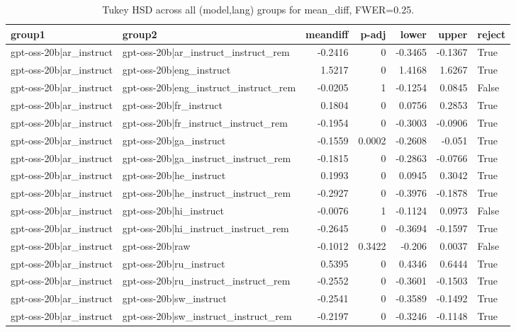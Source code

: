 \begin{table}
\caption{Tukey HSD across all (model,lang) groups for mean_diff, FWER=0.25.}
\label{tab:tukey_all_models_all_langs_mean_diff}
\begin{tabular}{l l r r r r l}
\toprule
group1 & group2 & meandiff & p-adj & lower & upper & reject \\
\midrule
gpt-oss-20b|ar_instruct & gpt-oss-20b|ar_instruct_instruct_rem & -0.2416 & 0 & -0.3465 & -0.1367 & True \\
gpt-oss-20b|ar_instruct & gpt-oss-20b|eng_instruct & 1.5217 & 0 & 1.4168 & 1.6267 & True \\
gpt-oss-20b|ar_instruct & gpt-oss-20b|eng_instruct_instruct_rem & -0.0205 & 1 & -0.1254 & 0.0845 & False \\
gpt-oss-20b|ar_instruct & gpt-oss-20b|fr_instruct & 0.1804 & 0 & 0.0756 & 0.2853 & True \\
gpt-oss-20b|ar_instruct & gpt-oss-20b|fr_instruct_instruct_rem & -0.1954 & 0 & -0.3003 & -0.0906 & True \\
gpt-oss-20b|ar_instruct & gpt-oss-20b|ga_instruct & -0.1559 & 0.0002 & -0.2608 & -0.051 & True \\
gpt-oss-20b|ar_instruct & gpt-oss-20b|ga_instruct_instruct_rem & -0.1815 & 0 & -0.2863 & -0.0766 & True \\
gpt-oss-20b|ar_instruct & gpt-oss-20b|he_instruct & 0.1993 & 0 & 0.0945 & 0.3042 & True \\
gpt-oss-20b|ar_instruct & gpt-oss-20b|he_instruct_instruct_rem & -0.2927 & 0 & -0.3976 & -0.1878 & True \\
gpt-oss-20b|ar_instruct & gpt-oss-20b|hi_instruct & -0.0076 & 1 & -0.1124 & 0.0973 & False \\
gpt-oss-20b|ar_instruct & gpt-oss-20b|hi_instruct_instruct_rem & -0.2645 & 0 & -0.3694 & -0.1597 & True \\
gpt-oss-20b|ar_instruct & gpt-oss-20b|raw & -0.1012 & 0.3422 & -0.206 & 0.0037 & False \\
gpt-oss-20b|ar_instruct & gpt-oss-20b|ru_instruct & 0.5395 & 0 & 0.4346 & 0.6444 & True \\
gpt-oss-20b|ar_instruct & gpt-oss-20b|ru_instruct_instruct_rem & -0.2552 & 0 & -0.3601 & -0.1503 & True \\
gpt-oss-20b|ar_instruct & gpt-oss-20b|sw_instruct & -0.2541 & 0 & -0.3589 & -0.1492 & True \\
gpt-oss-20b|ar_instruct & gpt-oss-20b|sw_instruct_instruct_rem & -0.2197 & 0 & -0.3246 & -0.1148 & True \\

\end{tabular}
\end{table}

